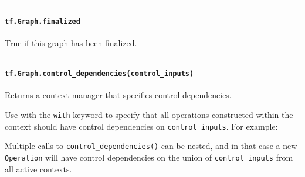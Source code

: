 \begin{center}\rule{0.5\linewidth}{\linethickness}\end{center}

\paragraph{\texorpdfstring{\lstinline{tf.Graph.finalized}
}{tf.Graph.finalized }}\label{tf.graph.finalized}

True if this graph has been finalized.

\begin{center}\rule{0.5\linewidth}{\linethickness}\end{center}

\paragraph{\texorpdfstring{\lstinline{tf.Graph.control_dependencies(control_inputs)}
}{tf.Graph.control_dependencies(control_inputs) }}\label{tf.graph.controlux5fdependenciescontrolux5finputs}

Returns a context manager that specifies control dependencies.

Use with the \lstinline{with} keyword to specify that all operations
constructed within the context should have control dependencies on
\lstinline{control_inputs}. For example:

\begin{Shaded}
\begin{Highlighting}[]
 
  \OperatorTok{=} 
  \OperatorTok{=} 
\end{Highlighting}
\end{Shaded}

Multiple calls to \lstinline{control_dependencies()} can be nested, and in
that case a new \lstinline{Operation} will have control dependencies on the
union of \lstinline{control_inputs} from all active contexts.

\begin{Shaded}
\begin{Highlighting}[]
 
   
\end{Highlighting}
\end{Shaded}

